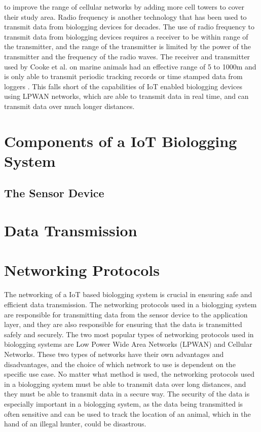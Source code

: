 \documentclass[sigplan,screen,nonacm]{acmart}
\begin{document}
to improve the range of cellular networks by adding more cell towers to cover
their study area. Radio frequency is another technology that has been used to
transmit data from biologging devices for decades. The use of radio frequency
to transmit data from biologging devices requires a receiver to be within range
of the transmitter, and the range of the transmitter is limited by the power of
the transmitter and the frequency of the radio waves. The receiver and transmitter
used by Cooke et al. on marine animals had an effective range of 5 to 1000m and 
is only able to transmit periodic tracking records or time stamped data from loggers
\cite{cooke2012biotelemetry}. This falls short of the capabilities of IoT enabled 
biologging devices using LPWAN networks, which are able to transmit data in real time, and can transmit 
data over much longer distances. 

\section{Components of a IoT Biologging System}
\label{sec:Components of a IoT Biologging Device}

\subsection{The Sensor Device}
\label{subsec:The Sensor Device}


\section{Data Transmission}
\label{sec:Data Transmission}

\section{Networking Protocols}
\label{sec:Networking Protocols}

The networking of a IoT based biologging system is crucial in ensuring safe and
efficient data transmission. The networking protocols used in a biologging system
are responsible for transmitting data from the sensor device to the application
layer, and they are also responsible for ensuring that the data is transmitted
safely and securely. The two most popular types of networking protocols used in
biologging systems are Low Power Wide Area Networks (LPWAN) and Cellular Networks.
These two types of networks have their own advantages and disadvantages, and
the choice of which network to use is dependent on the specific use case. No
matter what method is used, the networking protocols used in a biologging system
must be able to transmit data over long distances, and they must be able to
transmit data in a secure way. The security of the data is especially important
in a biologging system, as the data being transmitted is often sensitive and
can be used to track the location of an animal, which in the hand of an illegal
hunter, could be disastrous.
\end{document}

